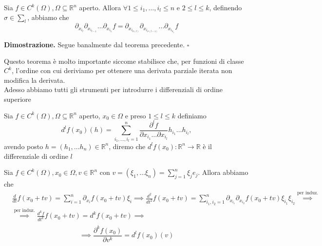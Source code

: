 \vspace{0.5cm}
\begin{theorem}
Sia $f \in C^k(\Omega), \Omega \subseteq \mathbb{R}^n$ aperto. Allora $\forall 1 \leq i_1, \ldots, i_l \leq n$ e $2 \leq l \leq k$, definendo $\sigma \in \sum_{l}$, abbiamo che
$$
\partial_{x_{i_l}} \partial_{x_{i_{l-1}}} \ldots \partial_{x_{i_1}} f = \partial_{x_{i_{\sigma(l)}}} \partial_{x_{i_{\sigma(l-1)}}} \ldots \partial_{x_{i_{\sigma_{1}}}} f
$$
\end{theorem}

\noindent \textbf{Dimostrazione. }
Segue banalmente dal teorema precedente.
\hfill $\square$

Questo teorema è molto importante siccome stabilisce che, per funzioni di classe $C^k$, l'ordine con cui deriviamo per ottenere una derivata parziale iterata non modifica la derivata. \\
Adesso abbiamo tutti gli strumenti per introdurre i differenziali di ordine superiore

\vspace{0.5cm}
\begin{definition}[\textcolor{blue}{differenziali di ordine superiore}]
	Sia $f \in C^k(\Omega), \Omega \subseteq \mathbb{R}^n$ aperto, $x_0 \in \Omega$ e preso $1 \leq l \leq k$ definiamo
	$$
	d^l f(x_0)(h) = \sum_{i_1, \ldots, i_l = 1}^n \frac{\partial^l f}{\partial x_{i_1} \ldots \partial x_{i_l}} h_{i_1} \ldots h_{i_l},
	$$
	avendo posto $h=(h_1, \ldots h_n) \in \mathbb{R}^n$, diremo che $d^l f(x_0):\mathbb{R}^n \to \mathbb{R}$ è il differenziale di ordine $l$
\end{definition}

\begin{remark}
Sia $f \in C^k (\Omega), x_0 \in \Omega, v \in \mathbb{R}^n$ con $v = (\xi_1, \ldots \xi_n) = \sum_{j=1}^n \xi_j e_j$. Allora abbiamo che
\[\begin{aligned}
&\frac{d}{dt} f(x_0 + tv) = \sum_{i=1}^n \partial_{x_i} f (x_0 + tv) \xi_i \implies \frac{d^2}{dt^2} f(x_0 + tv) = \sum_{i_1, i_2 = 1}^{n} \partial_{x_{i_1}} \partial_{x_{i_2}} f(x_0 + tv) \xi_{i_1} \xi_{i_2}\stackrel{\text{per induz.}}{\implies} \\ &\stackrel{\text{per induz.}}{\implies} \frac{d^k f}{dt^k} f(x_0 + tv) = d^k f(x_0 + tv) \implies \\
\end{aligned}\]
\begin{equation}
\implies \boxed{\frac{\partial^k f(x_0)}{\partial v^k} = d^l f(x_0)(v)}
\end{equation}
\end{remark}

